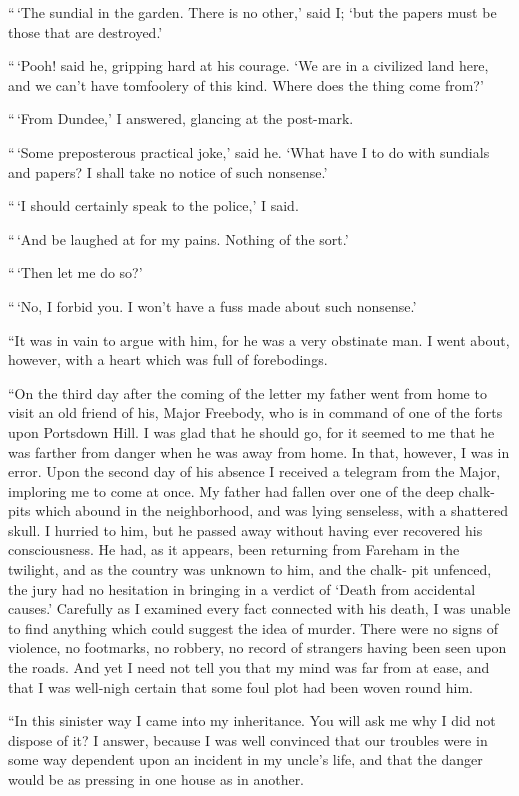 “\,‘The sundial in the garden. There is no other,’ said I;
‘but the papers must be those that are destroyed.’

“\,‘Pooh! said he, gripping hard at his courage. ‘We are
in a civilized land here, and we can’t have tomfoolery of this
kind. Where does the thing come from?’

“\,‘From Dundee,’ I answered, glancing at the post-mark.

“\,‘Some preposterous practical joke,’ said he. ‘What have
I to do with sundials and papers? I shall take no notice of
such nonsense.’

“\,‘I should certainly speak to the police,’ I said.

“\,‘And be laughed at for my pains. Nothing of the sort.’

“\,‘Then let me do so?’

“\,‘No, I forbid you. I won’t have a fuss made about such
nonsense.’

“It was in vain to argue with him, for he was a very obstinate
man. I went about, however, with a heart which was
full of forebodings.

“On the third day after the coming of the letter my father
went from home to visit an old friend of his, Major Freebody,
who is in command of one of the forts upon Portsdown Hill.
I was glad that he should go, for it seemed to me that he was
farther from danger when he was away from home. In that,
however, I was in error. Upon the second day of his absence
I received a telegram from the Major, imploring me to come
at once. My father had fallen over one of the deep chalk-%
pits which abound in the neighborhood, and was lying senseless,
with a shattered skull. I hurried to him, but he passed
away without having ever recovered his consciousness. He
had, as it appears, been returning from Fareham in the twilight,
and as the country was unknown to him, and the chalk-%
pit unfenced, the jury had no hesitation in bringing in a verdict
of ‘Death from accidental causes.’ Carefully as I examined
every fact connected with his death, I was unable to
find anything which could suggest the idea of murder. There
were no signs of violence, no footmarks, no robbery, no record
of strangers having been seen upon the roads. And yet I
need not tell you that my mind was far from at ease, and that
I was well-nigh certain that some foul plot had been woven
round him.

“In this sinister way I came into my inheritance. You will
ask me why I did not dispose of it? I answer, because I was
well convinced that our troubles were in some way dependent
upon an incident in my uncle’s life, and that the danger would
be as pressing in one house as in another.


